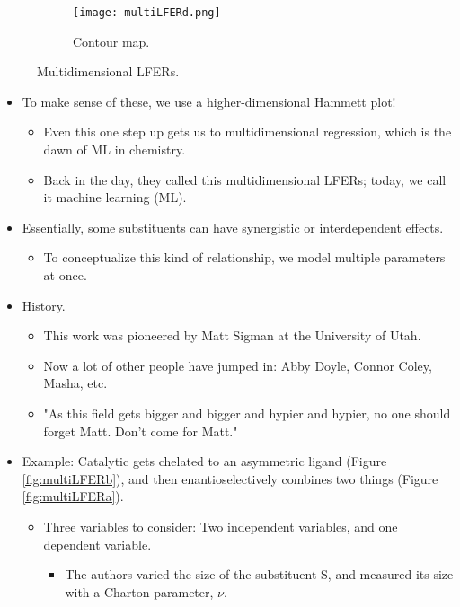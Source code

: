 \documentclass[../notes.tex]{subfiles}
\begin{document}
\begin{itemize}
\begin{figure}[h!]
        \begin{subfigure}[b]{0.35\linewidth}
            \centering
            \texttt{[image: multiLFERd.png]}
            \caption{Contour map.}
            \label{fig:multiLFERd}
        \end{subfigure}
        \caption{Multidimensional LFERs.}
        \label{fig:multiLFER}
    \end{figure}
    \pagebreak
    \begin{itemize}
        \item To make sense of these, we use a higher-dimensional Hammett plot!
        \begin{itemize}
            \item Even this one step up gets us to multidimensional regression, which is the dawn of ML in chemistry.
            \item Back in the day, they called this multidimensional LFERs; today, we call it machine learning (ML).
        \end{itemize}
        \item Essentially, some substituents can have synergistic or interdependent effects.
        \begin{itemize}
            \item To conceptualize this kind of relationship, we model multiple parameters at once.
        \end{itemize}
        \item History.
        \begin{itemize}
            \item This work was pioneered by Matt Sigman at the University of Utah.
            \item Now a lot of other people have jumped in: Abby Doyle, Connor Coley, Masha, etc.
            \item "As this field gets bigger and bigger and hypier and hypier, no one should forget Matt. Don't come for Matt."
        \end{itemize}
        \item Example: Catalytic  gets chelated to an asymmetric ligand (Figure \ref{fig:multiLFERb}), and then enantioselectively combines two things (Figure \ref{fig:multiLFERa}).
        \begin{itemize}
            \item Three variables to consider: Two independent variables, and one dependent variable.
            \begin{itemize}
                \item The authors varied the size of the substituent S, and measured its size with a Charton parameter, $\nu$.

\end{itemize}
\end{itemize}
\end{itemize}
\end{itemize}
\end{document}
